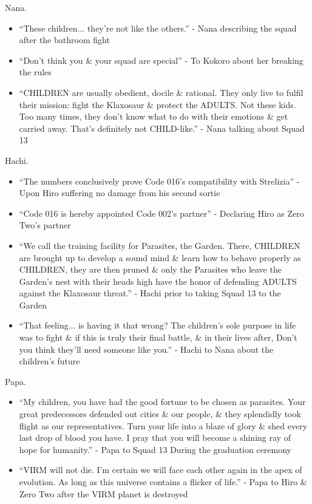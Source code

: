 \documentclass{article}
\begin{document}
\begin{enumerate}
    {\sc Nana.}
    \begin{itemize}
    	\item ``These children... they're not like the others.'' - Nana describing the squad after the bathroom fight
    	\item ``Don't think you \& your squad are special'' - To Kokoro about her breaking the rules
    	\item ``CHILDREN are usually obedient, docile \& rational. They only live to fulfil their mission: fight the Klaxosaur \& protect the ADULTS. Not these kids. Too many times, they don't know what to do with their emotions \& get carried away. That's definitely not CHILD-like.'' - Nana talking about Squad 13
    \end{itemize}
    {\sc Hachi.}
    \begin{itemize}
    	\item ``The numbers conclusively prove Code 016's compatibility with Strelizia'' - Upon Hiro suffering no damage from his second sortie
    	\item ``Code 016 is hereby appointed Code 002's partner'' - Declaring Hiro as Zero Two's partner
    	\item ``We call the training facility for Parasites, the Garden. There, CHILDREN are brought up to develop a sound mind \& learn how to behave properly as CHILDREN, they are then pruned \& only the Parasites who leave the Garden's nest with their heads high have the honor of defending ADULTS against the Klaxosaur threat.'' - Hachi prior to taking Squad 13 to the Garden
    	\item ``That feeling... is having it that wrong? The children's sole purpose in life was to fight \& if this is truly their final battle, \& in their lives after, Don't you think they'll need someone like you.'' - Hachi to Nana about the children's future
    \end{itemize}
    {\sc Papa.}
    \begin{itemize}
    	\item ``My children, you have had the good fortune to be chosen as parasites. Your great predecessors defended out cities \& our people, \& they splendidly took flight as our representatives. Turn your life into a blaze of glory \& shed every last drop of blood you have. I pray that you will become a shining ray of hope for humanity.'' - Papa to Squad 13 During the graduation ceremony
    	\item ``VIRM will not die. I'm certain we will face each other again in the apex of evolution. As long as this universe contains a flicker of life.'' - Papa to Hiro \& Zero Two after the VIRM planet is destroyed

\end{itemize}
\end{enumerate}
\end{document}
